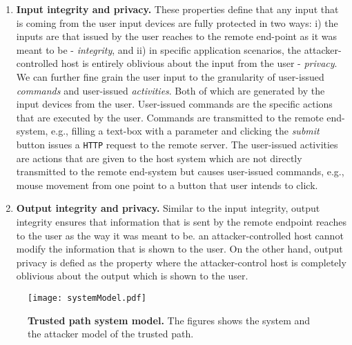 \begin{enumerate}[leftmargin=*]
  \item \textbf{Input integrity and privacy.} These properties define that any input that is coming from the user input devices are fully protected in two ways: i) the inputs are that issued by the user reaches to the remote end-point as it was meant to be - \emph{integrity}, and ii) in specific application scenarios, the attacker-controlled host is entirely oblivious about the input from the user - \emph{privacy}. We can further fine grain the user input to the granularity of user-issued \emph{commands} and user-issued \emph{activities}. Both of which are generated by the input devices from the user. User-issued commands are the specific actions that are executed by the user. Commands are transmitted to the remote end-system, e.g., filling a text-box with a parameter and clicking the \emph{submit} button issues a \texttt{HTTP} request to the remote server. The user-issued activities are actions that are given to the host system which are not directly transmitted to the remote end-system but causes user-issued commands, e.g., mouse movement from one point to a button that user intends to click.  
  
  \item \textbf{Output integrity and privacy.} Similar to the input integrity, output integrity ensures that information that is sent by the remote endpoint reaches to the user as the way it was meant to be. an attacker-controlled host cannot modify the information that is shown to the user. On the other hand, output privacy is defied as the property where the attacker-control host is completely oblivious about the output which is shown to the user. 
  \end{enumerate}

\begin{figure}[t]
\centering
\texttt{[image: systemModel.pdf]}
\caption{\textbf{Trusted path system model.} The figures shows the system and the attacker model of the trusted path.}
\label{fig:systemModel}
\centering
\end{figure}

\iffalse
\myparagraph{Advantages}

\begin{enumerate}
  \item The \device does not need to know the formatting/template of the page. As the \device only looks to the current mouse position, the structure of the page is somewhat irrelevant (?).
\end{enumerate}
\fi


